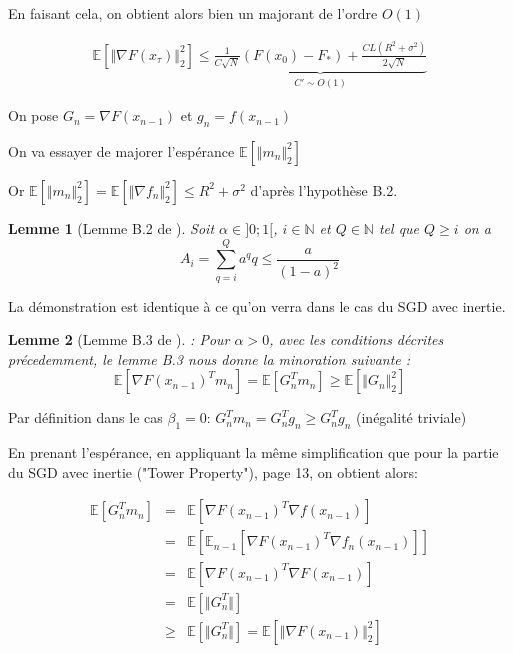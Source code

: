 \documentclass{article}
\newtheorem{lemma}{Lemme}
\begin{document}
En faisant cela, on obtient alors bien un majorant de l'ordre $O(1)$

 \begin{eqnarray*}
\mathbb{E}[ \Vert \nabla F(x_\tau) \Vert ^2_2] \leq \underbrace{\frac{1}{C\sqrt{N}} (F(x_0)-F_*) + \frac{C L (R^2+ \sigma^2)}{2 \sqrt{N}}}_{C' \sim O(1)}
\end{eqnarray*}

\bigskip 

On pose $G_n=\nabla F(x_{n-1})$ et $g_n=f(x_{n-1})$

\bigskip

On va essayer de majorer l'espérance $\mathbb{E}[ \Vert m_n \Vert ^2_2]$

\bigskip

Or $\mathbb{E}[ \Vert m_n \Vert ^2_2]=\mathbb{E}[ \Vert \nabla f_n \Vert ^2_2] \leq R^2+ \sigma^2$ d'après l'hypothèse B.2.

\bigskip



\begin{lemma}[Lemme B.2 de \cite{defossez2022a}]
Soit $\alpha \in ]0;1[$, $i \in \mathbb{N}$ et $Q\in \mathbb{N}$ tel que $Q\geq i$ on a
\begin{equation}
A_i=\sum_{q=i}^{Q} a^q q \leq \frac{a}{(1-a)^2}
\end{equation}
\end{lemma}


\bigskip

La démonstration est identique à ce qu'on verra dans le cas du SGD avec inertie.

\bigskip

\begin{lemma}[Lemme B.3 de \cite{defossez2022a}]: Pour $\alpha>0$, avec les conditions décrites précedemment, le lemme B.3 nous donne la minoration suivante :
\[
\mathbb{E}[\nabla F(x_{n-1})^T m_n]=\mathbb{E}[G_n^T m_n] \geq \mathbb{E}[ \Vert G_n \Vert ^2_2] \]
\end{lemma}

\bigskip

Par définition dans le cas $\beta_1=0$: $G_n^T m_n=G_n^T g_n \geq G_n^T g_n$ (inégalité triviale)
\
\bigskip

En prenant l'espérance, en appliquant la même simplification que pour la partie du SGD avec inertie ("Tower Property"), page 13, on obtient alors:

\begin{eqnarray*}
\mathbb{E}[G_n^T m_n]
&=&\mathbb{E}[\nabla F(x_{n-1})^T \nabla f(x_{n-1})]\\
&=& \mathbb{E}[\mathbb{E}_{n-1}[\nabla F(x_{n-1})^T \nabla f_{n}(x_{n-1})]]\\
&=&\mathbb{E}[\nabla F(x_{n-1})^T \nabla F(x_{n-1})]\\
&=& \mathbb{E}[ \Vert G_n^T \Vert ]\\ 
&\geq& \mathbb{E}[ \Vert G_n^T \Vert ] = \mathbb{E}[ \Vert \nabla F(x_{n-1}) \Vert ^2_2]   
\end{eqnarray*}
\end{document}
